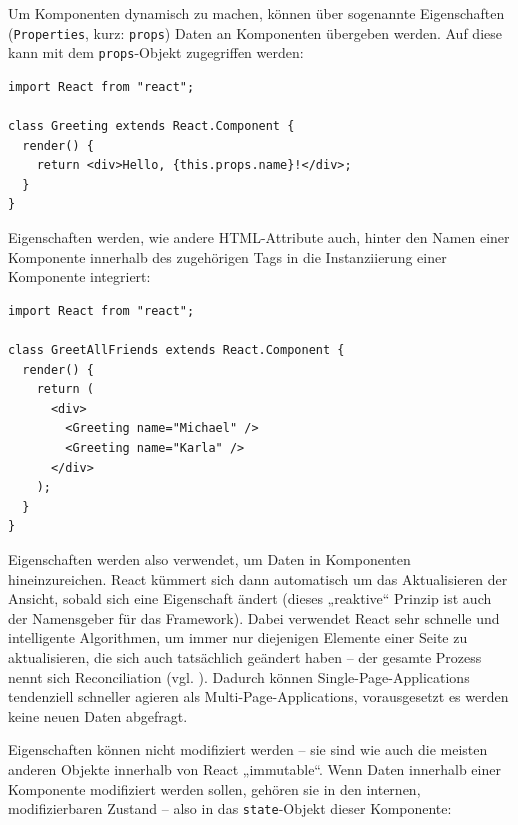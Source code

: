 Um Komponenten dynamisch zu machen, können über sogenannte Eigenschaften (\texttt{Properties}, kurz: \texttt{props}) Daten an Komponenten übergeben werden. Auf diese kann mit dem \texttt{props}-Objekt zugegriffen werden:

\begin{minipage}{\linewidth}
\begin{lstlisting}[caption={Komponenten erhalten Daten über ihre Eigenschaften (props).}]
import React from "react";

class Greeting extends React.Component {
  render() {
    return <div>Hello, {this.props.name}!</div>;
  }
}
\end{lstlisting}
\end{minipage}

Eigenschaften werden, wie andere HTML-Attribute auch, hinter den Namen einer Komponente innerhalb des zugehörigen Tags in die Instanziierung einer Komponente integriert:

\begin{minipage}{\linewidth}
\begin{lstlisting}[caption={Eigenschaften werden wie normale HTML-Attribute verwendet.}]
import React from "react";

class GreetAllFriends extends React.Component {
  render() {
    return (
      <div>
        <Greeting name="Michael" />
        <Greeting name="Karla" />
      </div>
    );
  }
}
\end{lstlisting}
\end{minipage}

Eigenschaften werden also verwendet, um Daten in Komponenten hineinzureichen. React kümmert sich dann automatisch um das Aktualisieren der Ansicht, sobald sich eine Eigenschaft ändert (dieses „reaktive“ Prinzip ist auch der Namensgeber für das Framework). Dabei verwendet React sehr schnelle und intelligente Algorithmen, um immer nur diejenigen Elemente einer Seite zu aktualisieren, die sich auch tatsächlich geändert haben – der gesamte Prozess nennt sich Reconciliation (vgl. \cite{web:react_reconciliation}). Dadurch können Single-Page-Applications tendenziell schneller agieren als Multi-Page-Applications, vorausgesetzt es werden keine neuen Daten abgefragt.

Eigenschaften können nicht modifiziert werden – sie sind wie auch die meisten anderen Objekte innerhalb von React „immutable“. Wenn Daten innerhalb einer Komponente modifiziert werden sollen, gehören sie in den internen, modifizierbaren Zustand – also in das \texttt{state}-Objekt dieser Komponente:

